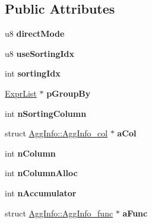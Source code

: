 \subsection*{Public Attributes}
\begin{DoxyCompactItemize}
\item 
\hypertarget{struct_agg_info_aaa57d294016ac7e17e7cacaa7b25634e}{u8 {\bfseries direct\-Mode}}\label{struct_agg_info_aaa57d294016ac7e17e7cacaa7b25634e}

\item 
\hypertarget{struct_agg_info_a8173a7ea13c4a12ce4befbcb40719073}{u8 {\bfseries use\-Sorting\-Idx}}\label{struct_agg_info_a8173a7ea13c4a12ce4befbcb40719073}

\item 
\hypertarget{struct_agg_info_a97ce74f509ca908a616c123e7196797b}{int {\bfseries sorting\-Idx}}\label{struct_agg_info_a97ce74f509ca908a616c123e7196797b}

\item 
\hypertarget{struct_agg_info_aa8e942103d224c4db847743670907781}{\hyperlink{struct_expr_list}{Expr\-List} $\ast$ {\bfseries p\-Group\-By}}\label{struct_agg_info_aa8e942103d224c4db847743670907781}

\item 
\hypertarget{struct_agg_info_a89925dccd1a0ec51d2a5a5dbaead66dc}{int {\bfseries n\-Sorting\-Column}}\label{struct_agg_info_a89925dccd1a0ec51d2a5a5dbaead66dc}

\item 
\hypertarget{struct_agg_info_a52fa1a7eb3145c27be13b2bcccd57d62}{struct \hyperlink{struct_agg_info_1_1_agg_info__col}{Agg\-Info\-::\-Agg\-Info\-\_\-col} $\ast$ {\bfseries a\-Col}}\label{struct_agg_info_a52fa1a7eb3145c27be13b2bcccd57d62}

\item 
\hypertarget{struct_agg_info_a9cbfa5fc33328cf3500426674e036a8b}{int {\bfseries n\-Column}}\label{struct_agg_info_a9cbfa5fc33328cf3500426674e036a8b}

\item 
\hypertarget{struct_agg_info_a2d826c17800c21fd27952545993227c7}{int {\bfseries n\-Column\-Alloc}}\label{struct_agg_info_a2d826c17800c21fd27952545993227c7}

\item 
\hypertarget{struct_agg_info_ad2251760d95af9024f0a3170405cb53b}{int {\bfseries n\-Accumulator}}\label{struct_agg_info_ad2251760d95af9024f0a3170405cb53b}

\item 
\hypertarget{struct_agg_info_a4e201acd6a1f8aed360c58e45f47c803}{struct \hyperlink{struct_agg_info_1_1_agg_info__func}{Agg\-Info\-::\-Agg\-Info\-\_\-func} $\ast$ {\bfseries a\-Func}}\label{struct_agg_info_a4e201acd6a1f8aed360c58e45f47c803}


\end{DoxyCompactItemize}
